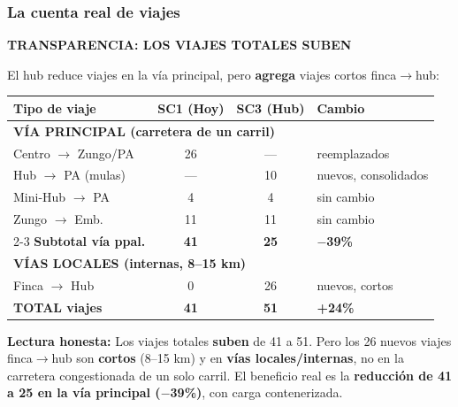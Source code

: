 \documentclass[aspectratio=169, 10pt]{beamer}
\newcommand{\tagline}[2]{{\scriptsize\color{#1}\textbf{\MakeUppercase{#2}}}}
\begin{document}
\begin{frame}
\frametitle{La cuenta real de viajes}
\tagline{amarillo}{Transparencia: los viajes totales SUBEN}
\vspace{-2pt}

{\scriptsize El hub reduce viajes en la v\'ia principal, pero \textbf{agrega} viajes cortos finca$\rightarrow$hub:}

\vspace{4pt}
\begin{center}
\scriptsize
\renewcommand{\arraystretch}{1.15}
\begin{tabular}{l c c l}
    \toprule
    \textbf{Tipo de viaje} & \textbf{SC1 (Hoy)} & \textbf{SC3 (Hub)} & \textbf{Cambio} \\
    \midrule
    \multicolumn{4}{l}{\textcolor{rojo}{\textbf{V\'IA PRINCIPAL (carretera de un carril)}}} \\
    \midrule
    Centro $\rightarrow$ Zungo/PA & \textcolor{rojo}{26} & --- & reemplazados \\
    Hub $\rightarrow$ PA (mulas) & --- & \textcolor{verde}{10} & {\tiny nuevos, consolidados} \\
    Mini-Hub $\rightarrow$ PA & 4 & 4 & sin cambio \\
    Zungo $\rightarrow$ Emb. & 11 & 11 & sin cambio \\
    \cmidrule{2-3}
    \textbf{Subtotal v\'ia ppal.} & \textcolor{rojo}{\textbf{41}} & \textcolor{verde}{\textbf{25}} & \textcolor{verde}{\textbf{$-$39\%}} \\
    \midrule
    \multicolumn{4}{l}{\textcolor{azul}{\textbf{V\'IAS LOCALES (internas, 8--15 km)}}} \\
    \midrule
    Finca $\rightarrow$ Hub & 0 & \textcolor{azul}{26} & {\tiny nuevos, cortos} \\
    \midrule
    \textbf{TOTAL viajes} & \textbf{41} & \textbf{51} & \textcolor{rojo}{\textbf{+24\%}} \\
    \bottomrule
\end{tabular}
\end{center}

\vspace{4pt}
\colorbox{amarilloclaro}{\parbox{\dimexpr\textwidth-12pt}{\scriptsize\strut
\textcolor{amarillo}{\textbf{Lectura honesta:}} Los viajes totales \textbf{suben} de 41 a 51.
Pero los 26 nuevos viajes finca$\rightarrow$hub son \textbf{cortos} (8--15 km) y en \textbf{v\'ias locales/internas},
no en la carretera congestionada de un solo carril. El beneficio real es la
\textbf{reducci\'on de 41 a 25 en la v\'ia principal ($-$39\%)}, con carga contenerizada.\strut}}
\end{frame}
\end{document}
